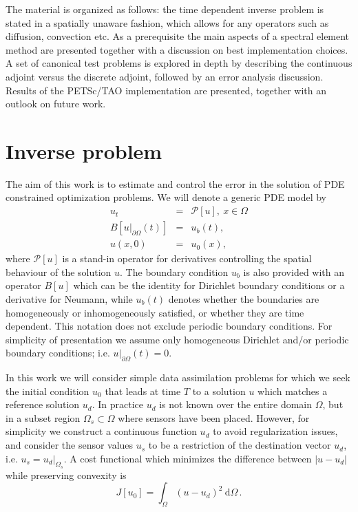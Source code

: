 \documentclass[10pt]{article}
\renewcommand{\d}{\mathrm{d}}
\newcommand{\dd}{\:\textrm{d}}
\newcommand{\CostFcn}{J}
\newcommand{\CostIntegrand}{g}
\begin{document}
{The material is organized as follows: the time dependent inverse
problem is stated in a spatially unaware fashion, which allows for any
operators such as diffusion, convection etc. As a prerequisite the
main aspects of a spectral element method are presented together with
a discussion on best implementation choices. A set of canonical test
problems is explored in depth by describing the continuous adjoint
versus the discrete adjoint, followed by an error analysis
discussion. Results of the PETSc/TAO implementation are presented,
together with an outlook on future work.


  
\section{Inverse problem\label{sec:inverse}}
The aim of this work is to estimate and control the error in the solution of PDE constrained optimization problems. %
We will denote a generic PDE model by
\begin{eqnarray}
 u_t &=& \mathcal P[ u ] , \  x \in \Omega \\ \nonumber
   B[u|_{\partial \Omega}(t)]&=& u_b(t), \\ \nonumber
   u( x,0)&=& u_0( x),\nonumber
\label{eq:generic}\end{eqnarray} 
where $\mathcal P[ u ]$ is a stand-in operator for derivatives
controlling the spatial behaviour of the solution $u$. The boundary
condition $u_b$ is also provided with an operator $B[u]$ which can be
the identity for Dirichlet boundary conditions or a derivative for
Neumann, while $u_b(t)$ denotes whether the boundaries are
homogeneously or inhomogeneously satisfied, or whether they are time
dependent. This notation does not exclude periodic boundary
conditions. For simplicity of presentation we assume only homogeneous Dirichlet and/or periodic boundary conditions; i.e.  $u|_{\partial \Omega}(t)= 0.$

%
%

In this work we will consider simple data assimilation problems  for which we seek the initial condition $u_0$ that leads at time $T$ to a solution
$u$ which matches a reference solution $u_d$. In practice $ u_d$  is not known over the entire domain $\Omega$, but in a subset region $\Omega_s\subset \Omega$ where sensors have been placed. However, for simplicity we construct a continuous function
$u_d$ to avoid regularization issues, and consider the sensor values $u_s$ to be a restriction of the destination vector $u_d$, i.e. $u_s=u_d|_{\Omega_s}$. 
A cost functional which minimizes the difference between $| u- u_d|$ while preserving convexity is
\begin{equation}
  J[u_0]=\int_{\Omega}(u- u_d)^2 \ \d \Omega \,.  \label{eq:Cost_general}
\end{equation}

}
\end{document}
